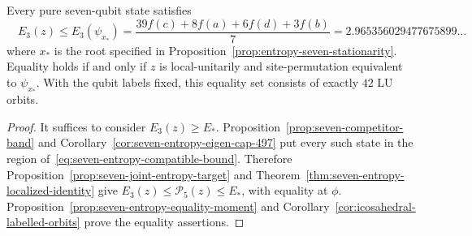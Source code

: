 \begin{theorem}
\label{thm:seven-entropy-global-maximum}
Every pure seven-qubit state satisfies
\begin{equation}\label{eq:seven-entropy-global-maximum}
 \boxed{\quad E_3(z)\le E_3(\psi_{x_*})
 =\frac{39f(c)+8f(a)+6f(d)+3f(b)}7
 =2.965356029477675899\ldots\quad}
\end{equation}
where $x_*$ is the root specified in
Proposition~\ref{prop:entropy-seven-stationarity}. Equality holds if and only if $z$ is local-unitarily and site-permutation
equivalent to $\psi_{x_*}$. With the qubit labels fixed, this equality set
consists of exactly $42$ LU orbits.
\end{theorem}
\begin{proof}
It suffices to consider $E_3(z)\ge E_*$. Proposition~\ref{prop:seven-competitor-band}
and Corollary~\ref{cor:seven-entropy-eigen-cap-497} put every such state
in the region of~\eqref{eq:seven-entropy-compatible-bound}. Therefore
Proposition~\ref{prop:seven-joint-entropy-target} and
Theorem~\ref{thm:seven-entropy-localized-identity} give
$E_3(z)\le\mathcal P_5(z)\le E_*$, with equality at $\phi$. Proposition~\ref{prop:seven-entropy-equality-moment}
and Corollary~\ref{cor:icosahedral-labelled-orbits} prove the equality assertions.
\end{proof}
